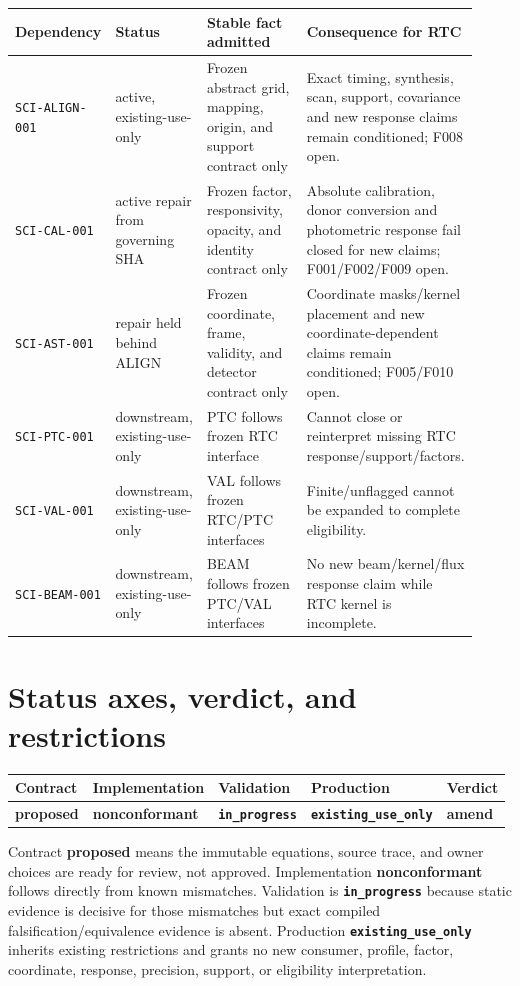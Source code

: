 \documentclass[11pt]{article}
\newcommand{\code}[1]{\nolinkurl{#1}}
\newcommand{\status}[1]{\textbf{\nolinkurl{#1}}}
\begin{document}
\begin{longtable}{@{}L{0.18\linewidth}L{0.19\linewidth}L{0.25\linewidth}L{0.30\linewidth}@{}}
\toprule
Dependency & Status & Stable fact admitted & Consequence for RTC \\
\midrule
\endhead
\code{SCI-ALIGN-001} & active, existing-use-only & Frozen abstract grid, mapping, origin, and support contract only & Exact timing, synthesis, scan, support, covariance and new response claims remain conditioned; F008 open. \\
\code{SCI-CAL-001} & active repair from governing SHA & Frozen factor, responsivity, opacity, and identity contract only & Absolute calibration, donor conversion and photometric response fail closed for new claims; F001/F002/F009 open. \\
\code{SCI-AST-001} & repair held behind ALIGN & Frozen coordinate, frame, validity, and detector contract only & Coordinate masks/kernel placement and new coordinate-dependent claims remain conditioned; F005/F010 open. \\
\code{SCI-PTC-001} & downstream, existing-use-only & PTC follows frozen RTC interface & Cannot close or reinterpret missing RTC response/support/factors. \\
\code{SCI-VAL-001} & downstream, existing-use-only & VAL follows frozen RTC/PTC interfaces & Finite/unflagged cannot be expanded to complete eligibility. \\
\code{SCI-BEAM-001} & downstream, existing-use-only & BEAM follows frozen PTC/VAL interfaces & No new beam/kernel/flux response claim while RTC kernel is incomplete. \\
\bottomrule
\end{longtable}

\section{Status axes, verdict, and restrictions}

\begin{center}
\begin{tabular}{lllll}
\toprule
Contract & Implementation & Validation & Production & Verdict \\
\midrule
\textbf{proposed} & \textbf{nonconformant} & \status{in_progress} &
\status{existing_use_only} & \textbf{amend} \\
\bottomrule
\end{tabular}
\end{center}

Contract \textbf{proposed} means the immutable equations, source trace, and
owner choices are ready for review, not approved.  Implementation
\textbf{nonconformant} follows directly from known mismatches.  Validation is
\status{in_progress} because static evidence is decisive for those mismatches
but exact compiled falsification/equivalence evidence is absent.  Production
\status{existing_use_only} inherits existing restrictions and grants no new
consumer, profile, factor, coordinate, response, precision, support, or
eligibility interpretation.
\end{document}

